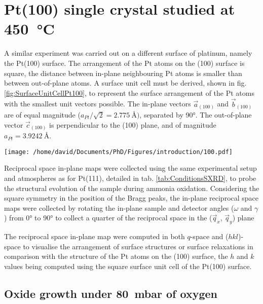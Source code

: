 \section{Pt(100) single crystal studied at \qty{450}{\degreeCelsius}} \label{sec:SXRD100}

A similar experiment was carried out on a different surface of platinum, namely the Pt(100) surface.
The arrangement of the Pt atoms on the (100) surface is square, the distance between in-plane neighbouring Pt atoms is smaller than between out-of-plane atoms.
A surface unit cell must be derived, shown in fig. \ref{fig:SurfaceUnitCellPt100}, to represent the surface arrangement of the Pt atoms with the smallest unit vectors possible.
The in-plane vectors $\vec{a}_{(100)}$ and $\vec{b}_{(100)}$ are of equal magnitude ($a_{Pt} / \sqrt{2} = \qty{2.775}{\angstrom})$, separated by \ang{90}.
The out-of-plane vector $\vec{c}_{(100)}$ is perpendicular to the (100) plane, and of magnitude $a_{Pt} = \qty{3.9242}{\angstrom}$.

\begin{SCfigure}
    \centering
    \texttt{[image: /home/david/Documents/PhD/Figures/introduction/100.pdf]}
    \caption{
        Face-entered cubic unit cell of Pt with $(100)$ crystallographic plane drawn in green.
        $\vec{a}_{(100)}$, $\vec{b}_{(100)}$ and $\vec{c}_{(100)}$ are the $(100)$ surface unit cell vectors.
    }
    \label{fig:SurfaceUnitCellPt100}
\end{SCfigure}

Reciprocal space in-plane maps were collected using the same experimental setup and atmospheres as for Pt(111), detailed in tab. \ref{tab:ConditionsSXRD}, to probe the structural evolution of the sample during ammonia oxidation.
Considering the square symmetry in the position of the Bragg peaks, the in-plane reciprocal space maps were collected by rotating the in-plane sample and detector angles ($\omega$ and $\gamma$) from \ang{0} to \ang{90} to collect a quarter of the reciprocal space in the ($\vec{q}_x$, $\vec{q}_y$) plane

The reciprocal space in-plane map were computed in both $q$-space and ($hkl$)-space to visualise the arrangement of surface structures or surface relaxations in comparison with the structure of the Pt atoms on the (100) surface, the $h$ and $k$ values being computed using the square surface unit cell of the Pt(100) surface.

\subsection{Oxide growth under \qty{80}{\milli\bar} of oxygen}

